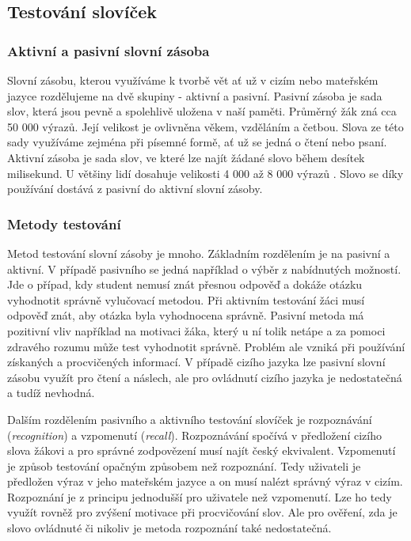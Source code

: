 \documentclass[a4paper,11pt,titlepage,fleqn]{article}
\begin{document}
    \subsection{Testování slovíček}

        \subsubsection{Aktivní a pasivní slovní zásoba}
            Slovní zásobu, kterou využíváme k tvorbě vět ať už v cizím nebo mateřském jazyce rozdělujeme na dvě skupiny - aktivní a pasivní. Pasivní zásoba je sada slov, která jsou pevně a spolehlivě uložena v naší paměti. Průměrný žák zná cca 50 000 výrazů. Její velikost je ovlivněna věkem, vzděláním a četbou. Slova ze této sady využíváme zejména při písemné formě, ať už se jedná o čtení nebo psaní. Aktivní zásoba je sada slov, ve které lze najít žádané slovo během desítek milisekund. U většiny lidí dosahuje velikosti 4 000 až 8 000 výrazů \cite{bib:lexikologie}. Slovo se díky používání dostává z pasivní do aktivní slovní zásoby. 

        \subsubsection{Metody testování}
            \label{test-methods}

            Metod testování slovní zásoby je mnoho. Základním rozdělením je na pasivní a aktivní. V případě pasivního se jedná například o výběr z nabídnutých možností. Jde o případ, kdy student nemusí znát přesnou odpověď a dokáže otázku vyhodnotit správně vylučovací metodou. Při aktivním testování žáci musí odpověď znát, aby otázka byla vyhodnocena správně. Pasivní metoda má pozitivní vliv například na motivaci žáka, který u ní tolik netápe a za pomoci zdravého rozumu může test vyhodnotit správně. Problém ale vzniká při používání získaných a procvičených informací. V případě cizího jazyka lze pasivní slovní zásobu využít pro čtení a náslech, ale pro ovládnutí cizího jazyka je nedostatečná a tudíž nevhodná. 

            Dalším rozdělením pasivního a aktivního testování slovíček je rozpoznávání (\textit{recognition}) a vzpomenutí (\textit{recall}). Rozpoznávání spočívá v předložení cizího slova žákovi a pro správné zodpovězení musí najít český ekvivalent. Vzpomenutí je způsob testování opačným způsobem než rozpoznání. Tedy uživateli je předložen výraz v jeho mateřském jazyce a on musí nalézt správný výraz v cizím. Rozpoznání je z principu jednodušší pro uživatele než vzpomenutí. Lze ho tedy využít rovněž pro zvýšení motivace při procvičování slov. Ale pro ověření, zda je slovo ovládnuté či nikoliv je metoda rozpoznání také nedostatečná.
\end{document}
